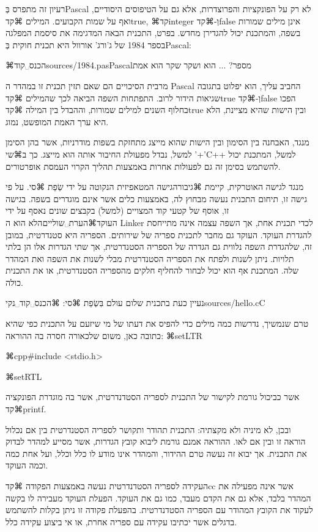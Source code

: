 {רעיון זה מתפרס בְּPascal לא רק על הפונקציות והפרוצדרות, אלא גם על הטיפוסים היסודיים, ואף על שמות הקבועים. המילים ⌘קד{true}, ⌘קד{integer} וְ-⌘קד{false}  אינן מילים שמורות בשפה, והמתכנת יכול להגדירן מחדש. בפרט, התכנית הבאה המדגימה את סיסמת המפלגה בספר 1984 של ג'ורג' אורוול היא תכנית חוקית בְּPascal:

⌘הכנס␣קוד{sources/1984.pas}{Pascal}{מספר? ... הוא ושקר שקר הוא אמת}


מרבית הסיכויים הם שאם תזין תכנית זו במהדר ה Pascal החביב עליך, הוא יפלוט בתגובה שגיאות הידור לרוב. התפתחות השפה הביאה לכך שהמילים ⌘קד{true} וְ-⌘קד{false} הפכו בחלוף השנים למילים שמורות, וההבדל בין המילה ⌘קד{true} ובין הישות שהיא מציינת, הלא היא ערך האמת המופשט, נמוג.

מנגד, האבחנה בין הסימון ובין הישות שהוא מייצג מתחזקת בשפות מודרניות, אשר בהן הסימן '+' למשל, נבדל מפעולת החיבור אותה הוא מייצג. כך ב⌘שי{C++} למשל, המתכנת יכול להשתמש בסימן זה גם לפעולות אחרות באמצעות תהליך הקרוי העמסת אופרטורים.

מנגד לגישה האוטרקית, קיימת ⌘גיבור{הגישה המטאפיזית} הנקוטה על ידי שְׂפַת ⌘סי. על פי גישה זו, תיחום התכנית נעשה מבחוץ לה, באמצעות כלים אשר אינם מוגדרים בשפה. בגישה זו, אוסף של קטעי קוד המצויים (למשל) בקבצים שונים נאסף על ידי העוקד⌘הערת␣שוליים{הלא הוא ה Linker} לכדי תכנית אחת, אך השפה עצמה אינה מתייחסת להגדרת העוקד. העוקד גם מחבר לתכנית ספריה של שירותים. הספריה היא סטנדרטית, במובן זה, שלהגדרת השפה נלווית גם הגדרה של הספריה הסטנדרטית, אך שתי הגדרות אלו הן בלתי תלויות. ניתן לשנות ולפתח את הספריה הסטנדרטית מבלי לשנות את השפה ואת המהדר שלה. המתכנת אף הוא יכול לבחור להחליף חלקים מהספריה הסטנדרטית, או את התכנית כולה. 

נעיין כעת בתכנית שלום עולם בִּשְׂפַת ⌘סי:
⌘הכנס␣קוד␣נקי{sources/hello.c}{C}

טרם שנמשיך, נדרשות כמה מילים כדי להפיס את דעתו של מי שיזעם על התכנית כפי שהיא כתובה כאן, משום שלכאורה חסרה בה ההוראה:
⌘setLTR{}

⌘cpp{#include <stdio.h>}

⌘setRTL{}

אשר כביכול גורמת לקישור של התכנית לספריה הסטדנדרטית, אשר בה מוגדרת הפונקציה ⌘קד{printf}. 

ובכן, לא מיניה ולא מקצתיה: התכנית תהודר ותקושר לספריה הסטנדרטית בין אם נכלול הוראה זו ובין אם לאו. ההוראה אמנם גורמת ליבוא קובץ הגדרות, אשר מסייע למהדר לבדוק את התכנית. אך יבוא זה נעשה טרם ההידור, והמהדר אינו מודע לו כלל וכלל, ועל אחת כמה וכמה העוקד.
 
העקידה לספריה הסטדנדרטית נעשה באמצעות הפקודה ⌘קד{cc} אשר אינה מפעילה את המהדר בלבד, אלא גם את הקדם מעבד, כמו גם את העוקד. הפעלת העוקד מעבירה לו בקשה לעקוד את הקובץ המהודר עם הספריה הסטדנדרטית. בהפעלת פקודה זו ניתן בקלות להשתמש בדגלים אשר יכתיבו עקידה עם ספריה אחרת, או אי ביצוע עקידה כלל. 

}
